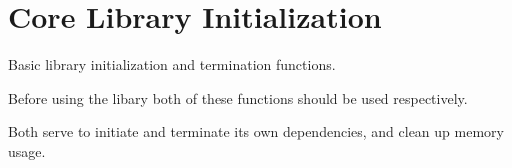 \chapter{Core Library Initialization }
\hypertarget{_basics}{}\label{_basics}
Basic library initialization and termination functions.

Before using the libary both of these functions should be used respectively.
\begin{DoxyItemize}
\item {}
\item {}
\end{DoxyItemize}


\begin{DoxyCode}{0}
\DoxyCodeLine{\}}

\end{DoxyCode}
 Both serve to initiate and terminate its own dependencies, and clean up memory usage. 